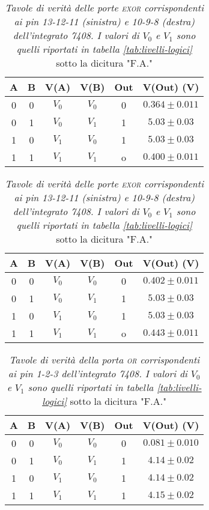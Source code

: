 \begin{table}[H]
  \centering
  \begin{subtable}[H]{0.5\textwidth}
    \centering
    \begin{tabular}[t]{c  c | c  c | c  c}
      \hline
      A & B & V(A) & V(B) & Out & V(Out) (V)\\
      \hline
      0 & 0 & $V_{0}$ & $V_{0}$ & 0 & $0.364 \pm 0.011$ \\
      0 & 1 & $V_{0}$ & $V_{1}$ & 1 & $5.03 \pm 0.03$ \\
      1 & 0 & $V_{1}$ & $V_{0}$ & 1 & $5.03 \pm 0.03$ \\
      1 & 1 & $V_{1}$ & $V_{1}$ & o & $0.400 \pm 0.011$ \\
      \hline
    \end{tabular}
  \end{subtable}

  \vspace{.5cm}

  \begin{subtable}[H]{0.5\textwidth}
    \centering
    \begin{tabular}[t]{c  c | c  c | c  c}
      \hline
      A & B & V(A) & V(B) & Out & V(Out) (V)\\
      \hline
      0 & 0 & $V_{0}$ & $V_{0}$ & 0 & $0.402 \pm 0.011$ \\
      0 & 1 & $V_{0}$ & $V_{1}$ & 1 & $5.03 \pm 0.03$ \\
      1 & 0 & $V_{1}$ & $V_{0}$ & 1 & $5.03 \pm 0.03$ \\
      1 & 1 & $V_{1}$ & $V_{1}$ & o & $0.443 \pm 0.011$ \\
      \hline
    \end{tabular}
  \end{subtable}
  \caption{\emph{Tavole di verità delle porte \textsc{exor} corrispondenti ai pin 13-12-11 (sinistra) e 10-9-8 (destra) dell'integrato 7408. I valori di $V_{0}$ e $V_{1}$ sono quelli riportati in tabella \ref{tab:livelli-logici}} sotto la dicitura "F.A."}
  \label{tab:exor-fulladder}
\end{table}

\begin{table}[H]
  \centering
  \begin{tabular}[t]{c  c | c  c | c  c}
    \hline
    A & B & V(A) & V(B) & Out & V(Out) (V)\\
    \hline
    0 & 0 & $V_{0}$ & $V_{0}$ & 0 & $0.081 \pm 0.010$ \\
    0 & 1 & $V_{0}$ & $V_{1}$ & 1 & $4.14 \pm 0.02$ \\
    1 & 0 & $V_{1}$ & $V_{0}$ & 1 & $4.14 \pm 0.02$ \\
    1 & 1 & $V_{1}$ & $V_{1}$ & 1 & $4.15 \pm 0.02$ \\
    \hline
  \end{tabular}
  \caption{\emph{Tavole di verità della porta \textsc{or} corrispondenti ai pin 1-2-3 dell'integrato 7408. I valori di $V_{0}$ e $V_{1}$ sono quelli riportati in tabella \ref{tab:livelli-logici}} sotto la dicitura "F.A."}
  \label{tab:or-fulladder}
\end{table}

